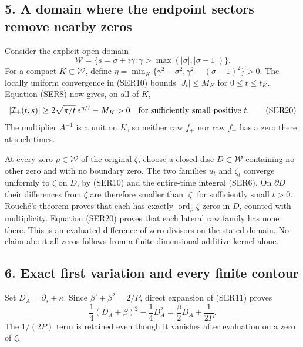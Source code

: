 \documentclass[
  10pt,
  a4paper,
]{article}
\begin{document}
\subsection{5. A domain where the endpoint sectors remove nearby
zeros}\label{a-domain-where-the-endpoint-sectors-remove-nearby-zeros}

Consider the explicit open domain \[
\mathcal W=\{s=\sigma+i\gamma:
\gamma>\max(|\sigma|,|\sigma-1|)\}.
\tag{SER19}
\] For a compact \(K\subset\mathcal W\), define
\(\eta=\min_K\{\gamma^2-\sigma^2,\gamma^2-(\sigma-1)^2\}>0\). The
locally uniform convergence in (SER10) bounds \(|J_t|\le M_K\) for
\(0\le t\le t_K\). Equation (SER8) now gives, on all of \(K\), \[
|\mathcal I_\pm(t,s)|\ge
2\sqrt{\pi/t}\,e^{\eta/t}-M_K>0
\quad\hbox{for sufficiently small positive }t.
\tag{SER20}
\] The multiplier \(A^{-1}\) is a unit on \(K\), so neither raw \(f_+\)
nor raw \(f_-\) has a zero there at such times.

At every zero \(\rho\in\mathcal W\) of the original \(\zeta\), choose a
closed disc \(D\subset\mathcal W\) containing no other zero and with no
boundary zero. The two families \(u_t\) and \(\zeta_t\) converge
uniformly to \(\zeta\) on \(D\), by (SER10) and the entire-time integral
(SER6). On \(\partial D\) their differences from \(\zeta\) are therefore
smaller than \(|\zeta|\) for sufficiently small \(t>0\). Rouché's
theorem proves that each has exactly \(\operatorname{ord}_\rho\zeta\)
zeros in \(D\), counted with multiplicity. Equation (SER20) proves that
each lateral raw family has none there. This is an evaluated difference
of zero divisors on the stated domain. No claim about all zeros follows
from a finite-dimensional additive kernel alone.

\subsection{6. Exact first variation and every finite
contour}\label{exact-first-variation-and-every-finite-contour}

Set \(D_A=\partial_s+\kappa\). Since \(\beta'+\beta^2=2/P\), direct
expansion of (SER11) proves \[
\frac14(D_A+\beta)^2-\frac14D_A^2
=\frac\beta2D_A+\frac1{2P}.
\tag{SER21}
\] The \(1/(2P)\) term is retained even though it vanishes after
evaluation on a zero of \(\zeta\).
\end{document}
